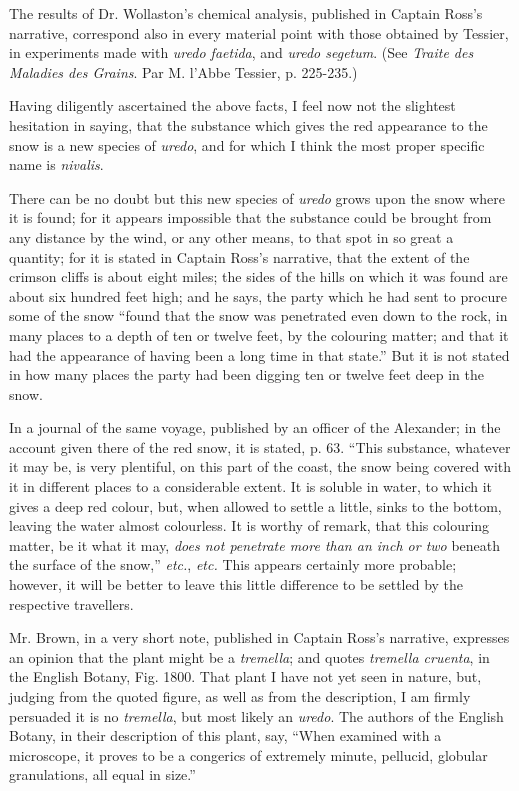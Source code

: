 \documentclass[a4paper, 12pt, oneside]{article}
\begin{document}
The results of Dr. Wollaston's chemical analysis, published in Captain Ross's narrative, correspond also in every material point with those obtained by Tessier, in experiments made with \emph{uredo faetida}, and \emph{uredo segetum}. (See \emph{Traite des Maladies des Grains}. Par M. l'Abbe Tessier, p. 225-235.)

Having diligently ascertained the above facts, I feel now not the slightest hesitation in saying, that the substance which gives the red appearance to the snow is a new species of \emph{uredo}, and for which I think the most proper specific name is \emph{nivalis}.

There can be no doubt but this new species of \emph{uredo} grows upon the snow where it is found; for it appears impossible that the substance could be brought from any distance by the wind, or any other means, to that spot in so great a quantity; for it is stated in Captain Ross's narrative, that the extent of the crimson cliffs is about eight miles; the sides of the hills on which it was found are about six hundred feet high; and he says, the party which he had sent to procure some of the snow ``found that the snow was penetrated even down to the rock, in many places to a depth of ten or twelve feet, by the colouring matter; and that it had the appearance of having been a long time in that state.'' But it is not stated in how many places the party had been digging ten or twelve feet deep in the snow.

In a journal of the same voyage, published by an officer of the Alexander; in the account given there of the red snow, it is stated, p. 63. ``This substance, whatever it may be, is very plentiful, on this part of the coast, the snow being covered with it in different places to a considerable extent. It is soluble in water, to which it gives a deep red colour, but, when allowed to settle a little, sinks to the bottom, leaving the water almost colourless. It is worthy of remark, that this colouring matter, be it what it may, \emph{does not penetrate more than an inch or two} beneath the surface of the snow,'' \emph{etc.}, \emph{etc.} This appears certainly more probable; however, it will be better to leave this little difference to be settled by the respective travellers.

Mr. Brown, in a very short note, published in Captain Ross's narrative, expresses an opinion that the plant might be a \emph{tremella}; and quotes \emph{tremella cruenta}, in the English Botany, Fig. 1800. That plant I have not yet seen in nature, but, judging from the quoted figure, as well as from the description, I am firmly persuaded it is no \emph{tremella}, but most likely an \emph{uredo}. The authors of the English Botany, in their description of this plant, say, ``When examined with a microscope, it proves to be a congerics of extremely minute, pellucid, globular granulations, all equal in size.''
\end{document}
